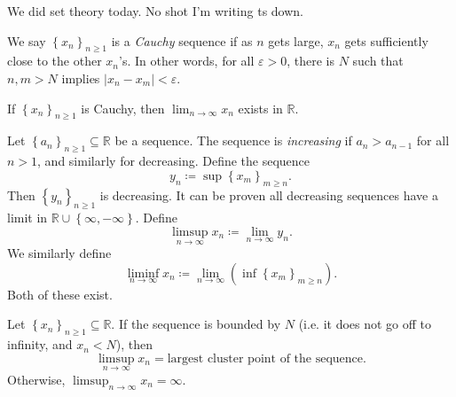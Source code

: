 We did set theory today. No shot I'm writing ts down.



\begin{definition}[Cauchy]\label{dfn:1}
	We say $\left\{ x_n \right\}_{n\geq 1} $ is a \emph{Cauchy} sequence if as $n$ gets large, $x_n$ gets sufficiently close to the other $x_n$'s. In other words, for all $\varepsilon >0$, there is $N$ such that $n,m>N$ implies $\left| x_n - x_m \right| <\varepsilon $.
\end{definition}
\begin{theorem}\label{thm:2}
	If $\left\{ x_n \right\}_{n\geq 1} $ is Cauchy, then $\lim_{n\to \infty } x_n$ exists in $\mathbb{R} $.
\end{theorem}

\begin{definition}\label{dfn:3}
	Let $\left\{ a_n \right\}_{n\geq 1} \subseteq \mathbb{R} $ be a sequence. The sequence is \emph{increasing} if $a_n > a_{n-1} $ for all $n>1$, and similarly for decreasing. Define the sequence
	\[
		y_n \coloneqq \sup \left\{ x_m \right\}_{m\geq n} 
	.\]
	Then $\left\{ y_n \right\}_{n\geq 1} $ is decreasing. It can be proven all decreasing sequences have a limit in $\mathbb{R} \cup \left\{ \infty ,-\infty  \right\} $. Define
	\[
		\limsup_{n \to \infty} x_n \coloneqq \lim_{n\to \infty } y_n
	.\]
	We similarly define
	\[
		\liminf_{n \to \infty} x_n \coloneqq \lim_{n\to \infty } \left( \inf \left\{ x_m \right\}_{m\geq n}  \right) 
	.\]
	Both of these exist.
\end{definition}

\begin{proposition}\label{prp:4}
	Let $\left\{ x_n \right\}_{n\geq 1} \subseteq \mathbb{R} $. If the sequence is bounded by $N$ (i.e. it does not go off to infinity, and $x_n < N$), then
	\[
		\limsup_{n \to \infty} x_n = \text{largest cluster point of the sequence}
	.\]
	Otherwise, $\limsup_{n \to \infty} x_n=\infty $.
\end{proposition}

